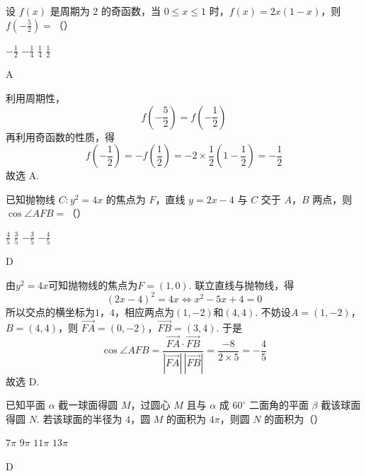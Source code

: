 \begin{problem}
设 \(f(x)\) 是周期为 \(2\) 的奇函数，当 \(0 \leqslant x \leqslant 1\) 时，\(f(x) = 2x(1 - x)\)，则 \(f\left(-\frac{5}{2}\right) =\)（\quad）

\choices
    {\(-\frac{1}{2}\)}
    {\(-\frac{1}{4}\)}
    {\(\frac{1}{4}\)}
    {\(\frac{1}{2}\)}
\end{problem}

\begin{answer}
A
\end{answer}

\begin{solution}
利用周期性，
\[
f\left(-\frac52\right)=f\left(-\frac12\right)
\]
再利用奇函数的性质，得
\[
f\left(-\frac12\right)=-f\left(\frac12\right)=-2\times\frac12\left(1-\frac12\right)=-\frac12
\]
故选 A.
\end{solution}


\begin{problem}
已知抛物线 \(C: y^{2} = 4x\) 的焦点为 \(F\)，直线 \(y = 2x - 4\) 与 \(C\) 交于 \(A\)，\(B\) 两点，则 \(\cos \angle AFB =\)（\quad）

\choices
    {\(\frac{4}{5}\)}
    {\(\frac{3}{5}\)}
    {\(-\frac{3}{5}\)}
    {\(-\frac{4}{5}\)}
\end{problem}

\begin{answer}
D
\end{answer}

\begin{solution}
由\(y^2=4x\)可知抛物线的焦点为\(F=(1,0)\). 联立直线与抛物线，得
\[
(2x-4)^2=4x
\Longleftrightarrow x^2-5x+4=0
\]
所以交点的横坐标为\(1\)，\(4\)，相应两点为\((1,-2)\)和\((4,4)\). 不妨设\(A=(1,-2)\)，\(B=(4,4)\)，则
\(\overrightarrow{FA}=(0,-2)\)，\(\overrightarrow{FB}=(3,4)\).
于是
\[
\cos\angle AFB
=\frac{\overrightarrow{FA}\cdot\overrightarrow{FB}}{|\overrightarrow{FA}|\,|\overrightarrow{FB}|}
=\frac{-8}{2\times5}=-\frac45
\]
故选 D.
\end{solution}


\begin{problem}
已知平面 \(\alpha\) 截一球面得圆 \(M\)，过圆心 \(M\) 且与 \(\alpha\) 成 \(60^{\circ}\) 二面角的平面 \(\beta\) 截该球面得圆 \(N\). 若该球面的半径为 \(4\)，圆 \(M\) 的面积为 \(4\pi\)，则圆 \(N\) 的面积为（\quad）

\choices
    {\(7\pi\)}
    {\(9\pi\)}
    {\(11\pi\)}
    {\(13\pi\)}
\end{problem}

\begin{answer}
D
\end{answer}

